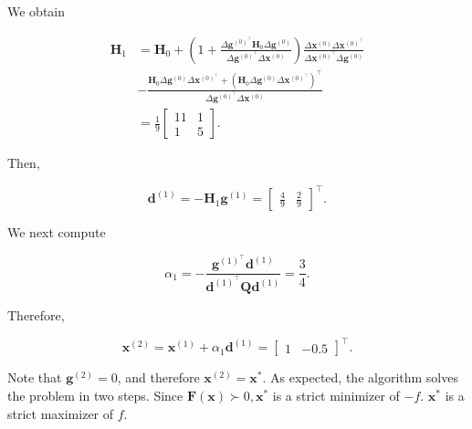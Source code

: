 We obtain

\[
	\begin{aligned}
		\boldsymbol{H}_{1} & =\boldsymbol{H}_{0}+\left(1+\frac{\Delta \boldsymbol{g}^{(0)^{\top}} \boldsymbol{H}_{0} \Delta \boldsymbol{g}^{(0)}}{\Delta \boldsymbol{g}^{(0)^{\top}} \Delta \boldsymbol{x}^{(0)}}\right) \frac{\Delta \boldsymbol{x}^{(0)} \Delta \boldsymbol{x}^{(0)^{\top}}}{\Delta \boldsymbol{x}^{(0)^{\top}} \Delta \boldsymbol{g}^{(0)}} \\
		& -\frac{\boldsymbol{H}_{0} \Delta \boldsymbol{g}^{(0)} \Delta \boldsymbol{x}^{(0)^{\top}}+\left(\boldsymbol{H}_{0} \Delta \boldsymbol{g}^{(0)} \Delta \boldsymbol{x}^{(0)^{\top}}\right)^{\top}}{\Delta \boldsymbol{g}^{(0)^{\top}} \Delta \boldsymbol{x}^{(0)}} \\
		& =\frac{1}{9}\left[\begin{array}{cc}
			11 & 1 \\
			1 & 5
		\end{array}\right] .
	\end{aligned}
\]

Then,

\[
	\boldsymbol{d}^{(1)}=-\boldsymbol{H}_{1} \boldsymbol{g}^{(1)}=\left[\begin{array}{ll}
		\frac{4}{9} & \frac{2}{9}
	\end{array}\right]^{\top} .
\]

We next compute

\[
	\alpha_{1}=-\frac{\boldsymbol{g}^{(1)^{\top}} \boldsymbol{d}^{(1)}}{\boldsymbol{d}^{(1)^{\top}} \boldsymbol{Q} \boldsymbol{d}^{(1)}}=\frac{3}{4} .
\]

Therefore,

\[
	\boldsymbol{x}^{(2)}=\boldsymbol{x}^{(1)}+\alpha_{1} \boldsymbol{d}^{(1)}=\left[\begin{array}{ll}
		1 & -0.5
	\end{array}\right]^{\top} .
\]

Note that \(\boldsymbol{g}^{(2)}=0\), and therefore \(\boldsymbol{x}^{(2)}=\boldsymbol{x}^{*}\). As expected, the algorithm solves the problem in two steps. Since \(\boldsymbol{F}(\boldsymbol{x}) \succ 0, \boldsymbol{x}^{*}\) is a strict minimizer of \(-f\). \(\boldsymbol{x}^{*}\) is a strict maximizer of \(f\).

